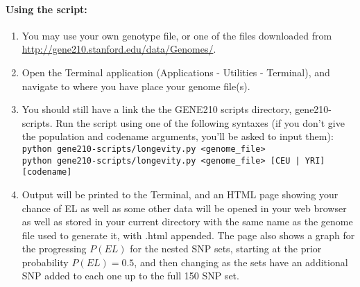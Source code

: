 \documentclass[a4paper, 12pt]{article}
\begin{document}
\paragraph{Using the script:}
\begin{enumerate}
  \item You may use your own genotype file, or one of the files downloaded from \url{http://gene210.stanford.edu/data/Genomes/}.
  \item Open the Terminal application (Applications - Utilities - Terminal), and navigate to where you have place your genome file(s).
  \item You should still have a link the the GENE210 scripts directory, gene210-scripts. 
    Run the script using one of the following syntaxes (if you don't give the population and codename arguments, you'll be asked to input them): \\
    \texttt{python gene210-scripts/longevity.py <genome\_file>} \\
    \texttt{python gene210-scripts/longevity.py <genome\_file> [CEU | YRI] [codename]}

  \item Output will be printed to the Terminal, and an HTML page showing your chance of EL as well as some other data will be opened in your web browser as well as stored in your current directory with the same name as the genome file used to generate it, with .html appended. 
    The page also shows a graph for the progressing $P(EL)$ for the nested SNP sets, starting at the prior probability $P(EL) = 0.5$, and then changing as the sets have an additional SNP added to each one up to the full 150 SNP set.

\end{enumerate}
\end{document}
